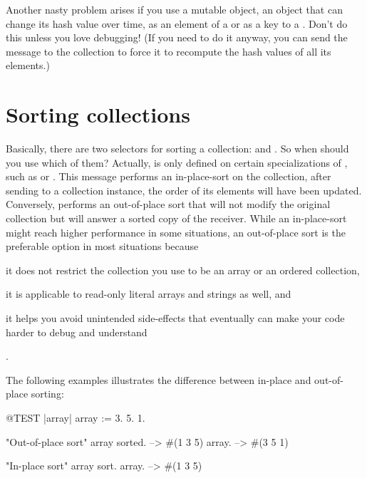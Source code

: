 \documentclass[a4paper,10pt,twoside]{book}
\begin{document}
Another nasty problem arises if you use a mutable object, \ie an object that can change its hash value over time, as an element of a  or as a key to a .
Don't do this unless you love debugging!
(If you need to do it anyway, you can send the message  to the collection to force it to recompute the hash values of all its elements.)

\section{Sorting collections}
\label{sec:sorting}
Basically, there are two selectors for sorting a collection:  and .
So when should you use which of them?
Actually,  is only defined on certain specializations of , such as  or .
This message performs an in-place-sort on the collection, \ie after sending  to a collection instance, the order of its elements will have been updated.
Conversely,  performs an out-of-place sort that will not modify the original collection but will answer a sorted copy of the receiver.
While an in-place-sort might reach higher performance in some situations, an out-of-place sort is the preferable option in most situations because \begin{enumerate*}[label={\alph*)}]\item it does not restrict the collection you use to be an array or an ordered collection, \item it is applicable to read-only literal arrays and strings as well, and \item it helps you avoid unintended side-effects that eventually can make your code harder to debug and understand\end{enumerate*}.

The following examples illustrates the difference between in-place and out-of-place sorting:

\begin{code}{@TEST |array|}
array := {3. 5. 1}.

"Out-of-place sort"
array sorted. --> #(1 3 5)
array. --> #(3 5 1)

"In-place sort"
array sort.
array. --> #(1 3 5)
\end{code}
\end{document}
